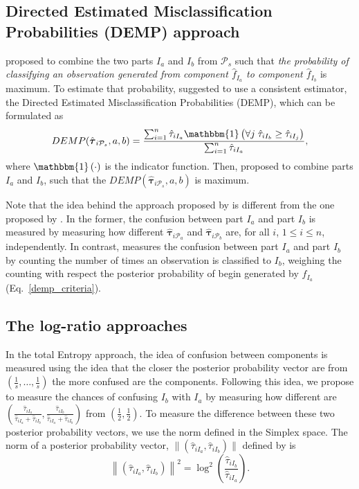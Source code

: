 \documentclass[10pt, a4paper]{article}
\newcommand{\m}[1]{\boldsymbol{#1}}
\begin{document}
\begin{spacing}{1.9}
\subsection{Directed Estimated Misclassification Probabilities (DEMP) approach}

\cite{hennig2010methods} proposed to combine the two parts $I_a$ and $I_b$ from $ \mathcal{P}_s$ such that \emph{the probability of classifying an observation generated from component $\hat{f}_{I_a}$ to component $\hat{f}_{I_b}$} is maximum. To estimate that probability,  \cite{hennig2010methods} suggested to use a consistent estimator, the Directed Estimated Misclassification Probabilities (DEMP), which can be formulated as
\begin{equation}\label{demp_criteria}
DEMP(\hat{\m \tau}_{i \mathcal{P}_s}, a, b) =\frac{ \sum_{i=1}^n {\hat{\tau}_{i I_a} \mathbbm{1}\left( \forall j\; \hat{\tau}_{i I_{b}} \geq \hat{\tau}_{i I_j} \right)}}{\sum_{i=1}^n \hat{\tau}_{i I_a} },
\end{equation}
where $\mathbbm{1}\left( \cdot \right)$ is the indicator function. Then, \cite{hennig2010methods} proposed to combine parts $I_a$ and $I_b$, such that the $DEMP(\hat{\m \tau}_{i \mathcal{P}_s}, a, b)$ is maximum.

Note that the idea behind the approach proposed by \cite{baudry2010combining} is different from the one proposed by \cite{hennig2010methods}. In the former, the confusion between part $I_a$ and part $I_b$ is measured by measuring how different $\hat{\m \tau}_{i \mathcal{P}_a}$ and $\hat{\m \tau}_{i \mathcal{P}_b}$ are, for all $i$, $1\leq i \leq n$, independently. In contrast, \cite{hennig2010methods} measures the confusion between part $I_a$ and part $I_b$ by counting the number of times an observation is classified to $I_b$, weighing the counting with respect the posterior probability of begin generated by $\hat{f}_{I_a}$ (Eq.~\ref{demp_criteria}).

\subsection{The log-ratio approaches}
\label{lr_approach}

In the total Entropy approach, the idea of confusion between components is measured using the idea that the closer the posterior probability vector are from $(\frac{1}{s}, \dots, \frac{1}{s})$ the more confused are the components. Following this idea, we propose to measure the chances of confusing $I_b$ with $I_a$  by measuring how different are $(\frac{\hat{\tau}_{i I_a}}{\hat{\tau}_{i I_a} + \hat{\tau}_{i I_b}}, \frac{\hat{\tau}_{i I_b}}{\hat{\tau}_{i I_a} + \hat{\tau}_{i I_b}})$ from $(\frac{1}{2}, \frac{1}{2})$. To measure the difference between these two posterior probability vectors, we use the norm defined in the Simplex space. The norm of a posterior probability vector, $\| (\hat{\tau}_{iI_a}, \hat{\tau}_{iI_b}) \|$  defined by \cite{aitchison2002simplicial} is
\[
\left\| (\hat{\tau}_{iI_a}, \hat{\tau}_{iI_b}) \right\|^2 = \log^2 \left(\frac{ \hat{\tau}_{iI_b} }{ \hat{\tau}_{iI_a} }\right).
\]


\end{spacing}
\end{document}
